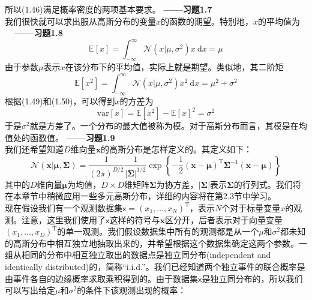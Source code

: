 \documentclass[b5paper]{book}
\numberwithin{equation}{chapter}
\begin{document}
{	\indent 所以(1.46)满足概率密度的两项基本要求。\color{red} \textbf{——习题1.7}　\color{black}\\
	\indent 我们很快就可以求出服从高斯分布的变量$x$的函数的期望。特别地，$x$的平均值为 \color{red} \textbf{\ \ ——习题1.8}　\color{black}
	\begin{equation}
		\mathbb{E}[x]=\int_{-\infty}^{\infty}\mathcal{N}(x|\mu,\sigma^2)x\ \mathrm{d}x = \mu
	\end{equation}
	\indent 由于参数$\mu$表示$x$在该分布下的平均值，实际上就是期望。类似地，其二阶矩
	\begin{equation}
		\mathbb{E}[x^2]=\int_{-\infty}^{\infty}\mathcal{N}(x|\mu,\sigma^2)x^2\ \mathrm{d}x = \mu^2+\sigma^2
	\end{equation}
	\indent 根据(1.49)和(1.50)，可以得到$x$的方差为
	\begin{equation}
		\mathrm{var}[x]=\mathbb{E}[x^2]-\mathbb{E}[x]^2=\sigma^2
	\end{equation}
	\indent 于是$\sigma^2$就是方差了。一个分布的最大值被称为模。对于高斯分布而言，其模是在均值处的函数值。\color{red} \textbf{——习题1.9}　\color{black}\\
	\indent 我们还希望知道$D$维向量$\mathbf{x}$的高斯分布是怎样定义的。其定义如下：
	\begin{equation}
		\mathcal{N}(\mathbf{x}|\boldsymbol{\mu}, \boldsymbol{\Sigma})=\frac{1}{(2\pi)^{D/2}}\frac{1}{|\boldsymbol{\Sigma}|^{1/2}}\exp\left\{-\frac{1}{2}(\mathbf{x}-\boldsymbol{\mu})^\mathrm{T}\boldsymbol{\Sigma}^{-1}(\mathbf{x}-\boldsymbol{\mu})\right\}
	\end{equation}
	\indent 其中的$D$维向量$\boldsymbol{\mu}$为均值，$D \times D$维矩阵$\boldsymbol{\Sigma}$为协方差，$|\boldsymbol{\Sigma}|$表示$\boldsymbol{\Sigma}$的行列式。我们将在本章节中稍微应用一些多元高斯分布，详细的内容将在第2.3节中学习。\\
	\indent 现在假设我们有一个观测数据集$\boldsymbol{\mathsf{x}}=(x_1,...,x_N)^\mathrm{T}$，表示$N$个对于标量变量$x$的观测。注意，这里我们使用了$\boldsymbol{\mathsf{x}}$这样的符号与$\mathbf{x}$区分开，后者表示对于向量变量$(x_1,...,x_D)^\mathrm{T}$的单一观测。我们假设数据集中所有的观测都是从一个$\mu$和$\sigma^2$都未知的高斯分布中相互独立地抽取出来的，并希望根据这个数据集确定这两个参数。一组从相同的分布中相互独立取出的数据点是独立同分布(independent and identically distributed)的，简称“i.i.d.”。我们已经知道两个独立事件的联合概率是由事件各自的边缘概率求取乘积得到的。由于数据集$\boldsymbol{\mathsf{x}}$是独立同分布的，所以我们可以写出给定$\mu$和$\sigma^2$的条件下该观测出现的概率：
	\begin{equation}

\end{equation}}
\end{document}
